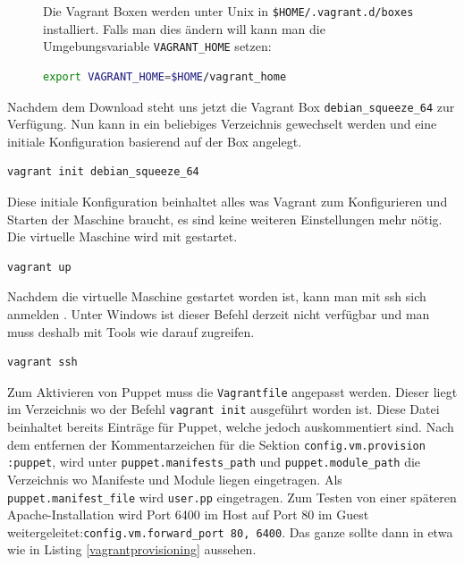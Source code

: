 \documentclass[12pt,a4paper,ngerman]{article}
\begin{document}
\begin{figure}
\vspace{-20pt}
\begin{boxedminipage}{4.5cm}
 Die Vagrant Boxen werden unter Unix in \lstinline!$HOME/.vagrant.d/boxes! installiert. 
Falls man dies ändern will kann man die Umgebungsvariable \lstinline$VAGRANT_HOME$ setzen:
\begin{lstlisting}[language=sh,label=vagrant-home,frame=none,numbers=none]
export VAGRANT_HOME=$HOME/vagrant_home
\end{lstlisting}
\end{boxedminipage}
\vspace{-20pt}
\end{figure}
 

Nachdem dem Download steht uns jetzt die  Vagrant Box \lstinline$debian_squeeze_64$ zur Verfügung. Nun kann in ein beliebiges Verzeichnis gewechselt werden und eine initiale Konfiguration basierend auf der Box angelegt.

\begin{lstlisting}[language=sh,caption=Vagrant initialisieren, label=vagrant-init]
vagrant init debian_squeeze_64
\end{lstlisting}

Diese initiale Konfiguration beinhaltet alles was Vagrant zum Konfigurieren und Starten der Maschine braucht, es sind keine weiteren Einstellungen mehr nötig. Die virtuelle Maschine  wird mit  gestartet.

\begin{lstlisting}[language=sh,caption=Starten der Vagrant Maschine, label=vagrant-up]
vagrant up
\end{lstlisting}

Nachdem die virtuelle Maschine gestartet worden ist, kann man mit ssh sich anmelden . Unter Windows ist dieser Befehl derzeit nicht verfügbar und man muss deshalb mit Tools wie \cite{putty} darauf zugreifen.
\begin{lstlisting}[language=sh,caption=Mit ssh in der Vagrant Maschine einsteigen, label=vagrant-ssh]
vagrant ssh
\end{lstlisting}
 
Zum Aktivieren von Puppet muss die \lstinline$Vagrantfile$ angepasst werden. Dieser liegt im Verzeichnis wo der Befehl \lstinline$vagrant init$ ausgeführt worden ist. Diese Datei beinhaltet bereits Einträge für Puppet, welche jedoch auskommentiert sind. Nach dem entfernen der Kommentarzeichen für die Sektion \lstinline$config.vm.provision :puppet$, wird unter \lstinline$puppet.manifests_path$ und \lstinline$puppet.module_path$ die Verzeichnis wo Manifeste und Module liegen eingetragen. Als \lstinline$puppet.manifest_file$ wird \lstinline$user.pp$ eingetragen. Zum Testen von einer späteren Apache-Installation wird Port 6400 im Host auf Port 80 im Guest weitergeleitet:\lstinline$config.vm.forward_port 80, 6400$. Das ganze sollte dann in etwa wie in Listing \ref{vagrantprovisioning} aussehen.
  
\end{document}
